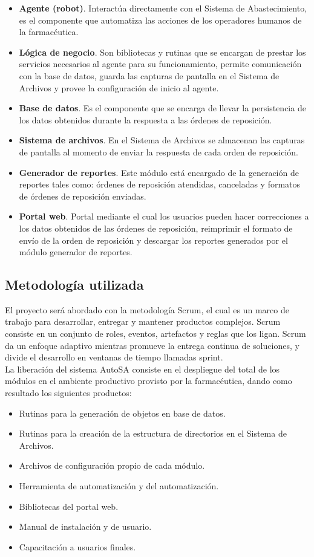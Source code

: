 \begin{itemize}
\item \textbf{Agente (robot)}. Interactúa directamente con el Sistema de Abastecimiento, es el componente que automatiza las acciones de los operadores humanos de la farmacéutica.
\item \textbf{Lógica de negocio}. Son bibliotecas y rutinas que se encargan de prestar los servicios necesarios al agente para su funcionamiento, permite comunicación con la base de datos, guarda las capturas de pantalla en el Sistema de Archivos y provee la configuración de inicio al agente.
\item \textbf{Base de datos}. Es el componente que se encarga de llevar la persistencia de los datos obtenidos durante la respuesta a las órdenes de reposición.
\item \textbf{Sistema de archivos}. En el Sistema de Archivos se almacenan las capturas de pantalla al momento de enviar la respuesta de cada orden de reposición.
\item \textbf{Generador de reportes}. Este módulo está encargado de la generación de reportes tales como: órdenes de reposición atendidas, canceladas y formatos de órdenes de reposición enviadas.
\item \textbf{Portal web}. Portal mediante el cual los usuarios pueden hacer correcciones a los datos obtenidos de las órdenes de reposición, reimprimir el formato de envío de la orden de reposición  y descargar los reportes generados por el módulo generador de reportes.
\end{itemize}

\subsection{Metodología utilizada}
El proyecto será abordado con la metodología Scrum, el cual es un marco de trabajo para desarrollar, entregar y mantener productos complejos. Scrum consiste en un conjunto de roles, eventos, artefactos y reglas que los ligan. Scrum da un enfoque adaptivo mientras promueve la entrega continua de soluciones, y divide el desarrollo en ventanas de tiempo llamadas sprint\cite{scrum}.\\
La liberación del sistema AutoSA consiste en el despliegue del total de los módulos en el ambiente productivo provisto por la farmacéutica, dando como resultado los siguientes productos:
\begin{itemize}
\item Rutinas para la generación de objetos en base de datos.
\item Rutinas para la creación de la estructura de directorios en el Sistema de Archivos.
\item Archivos de configuración propio de cada módulo.
\item Herramienta de automatización y del automatización.
\item Bibliotecas del portal web.
\item Manual de instalación y de usuario.
\item Capacitación a usuarios finales.
\end{itemize}
 
